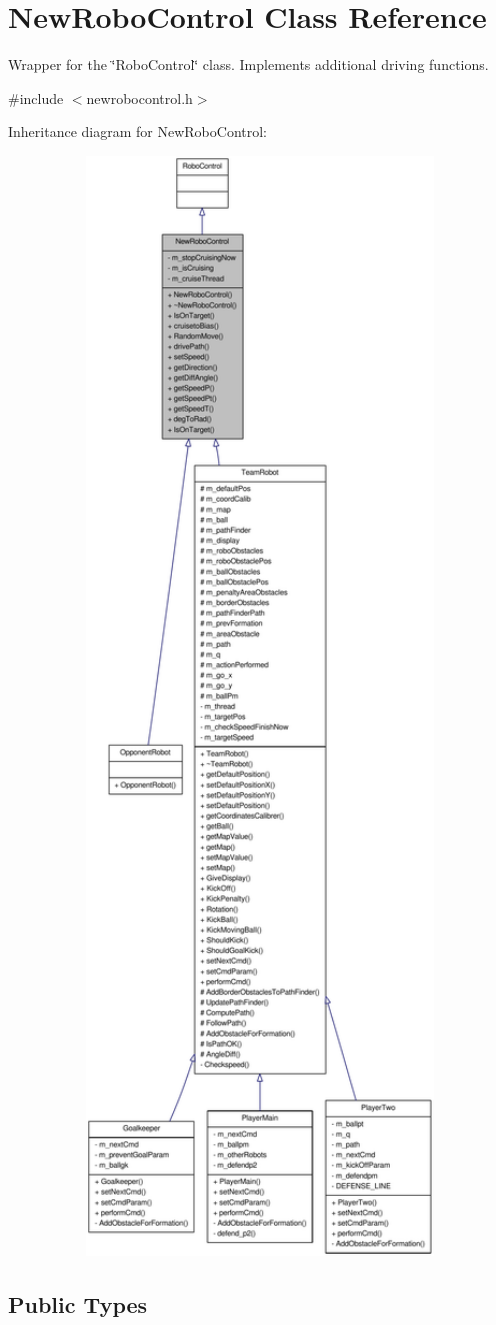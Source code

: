 \hypertarget{classNewRoboControl}{
\section{NewRoboControl Class Reference}
\label{classNewRoboControl}
}


Wrapper for the \char`\"{}RoboControl\char`\"{} class. Implements additional driving functions.  




{\ttfamily \#include $<$newrobocontrol.h$>$}



Inheritance diagram for NewRoboControl:\nopagebreak
\begin{figure}[H]
\begin{center}
\leavevmode
\includegraphics[width=400pt]{classNewRoboControl__inherit__graph}
\end{center}
\end{figure}
\subsection*{Public Types}
\begin{DoxyCompactItemize}
\item 
enum \hyperlink{classNewRoboControl_a077fa253b827c190e82c1ce1e4c8d18f}{eDirection} \{ \hyperlink{classNewRoboControl_a077fa253b827c190e82c1ce1e4c8d18fac7af9b70b7504bd260f486172de934d9}{FORWA
\end{DoxyCompactItemize}
